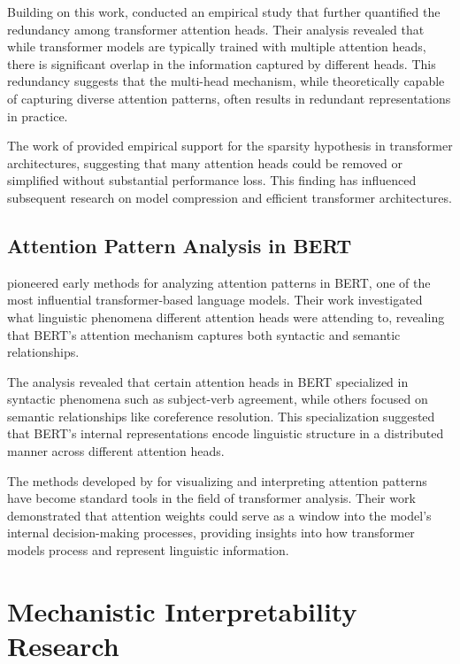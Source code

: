 Building on this work, \citet{michel2019sixteen} conducted an empirical study that further quantified the redundancy among transformer attention heads. Their analysis revealed that while transformer models are typically trained with multiple attention heads, there is significant overlap in the information captured by different heads. This redundancy suggests that the multi-head mechanism, while theoretically capable of capturing diverse attention patterns, often results in redundant representations in practice.

The work of \citet{michel2019sixteen} provided empirical support for the sparsity hypothesis in transformer architectures, suggesting that many attention heads could be removed or simplified without substantial performance loss. This finding has influenced subsequent research on model compression and efficient transformer architectures.

\subsection{Attention Pattern Analysis in BERT}

\citet{clark2019does} pioneered early methods for analyzing attention patterns in BERT, one of the most influential transformer-based language models. Their work investigated what linguistic phenomena different attention heads were attending to, revealing that BERT's attention mechanism captures both syntactic and semantic relationships.

The analysis revealed that certain attention heads in BERT specialized in syntactic phenomena such as subject-verb agreement, while others focused on semantic relationships like coreference resolution. This specialization suggested that BERT's internal representations encode linguistic structure in a distributed manner across different attention heads.

The methods developed by \citet{clark2019does} for visualizing and interpreting attention patterns have become standard tools in the field of transformer analysis. Their work demonstrated that attention weights could serve as a window into the model's internal decision-making processes, providing insights into how transformer models process and represent linguistic information.

\section{Mechanistic Interpretability Research}

